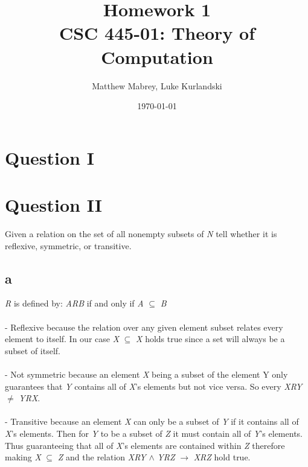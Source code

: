\documentclass{article}
\title{Homework 1\\[0.2em]\smaller{}CSC 445-01: Theory of Computation}
\author{Matthew Mabrey, Luke Kurlandski}
\date{\today}
\begin{document}
\maketitle

\section*{Question I}

\section*{Question II}

Given a relation on the set of all nonempty subsets of \textit{N} tell whether it is reflexive, symmetric, or transitive.

\subsection*{a} 
\textit{R} is defined by: \textit{ARB} if and only if \textit{A} $\subseteq$ \textit{B} 
\\\\  - Reflexive because the relation over any given element subset relates every element to itself. In our case \textit{X} $\subseteq$ \textit{X} holds true since a set will always be a subset of itself.
\\\\  - Not symmetric because an element \textit{X} being a subset of the element Y only guarantees that \textit{Y} contains all of \textit{X}'s elements but not vice versa. So every \textit{XRY} $\neq$ \textit{YRX}. 
\\\\  - Transitive because an element \textit{X} can only be a subset of \textit{Y} if it contains all of \textit{X}'s elements. Then for \textit{Y} to be a subset of \textit{Z} it must contain all of \textit{Y}'s elements. Thus guaranteeing that all of \textit{X}'s elements are contained within \textit{Z} therefore making \textit{X} $\subseteq$ \textit{Z} and the relation \textit{XRY} $\land$ \textit{YRZ} $\rightarrow$ \textit{XRZ} hold true.  
    
\end{document}
